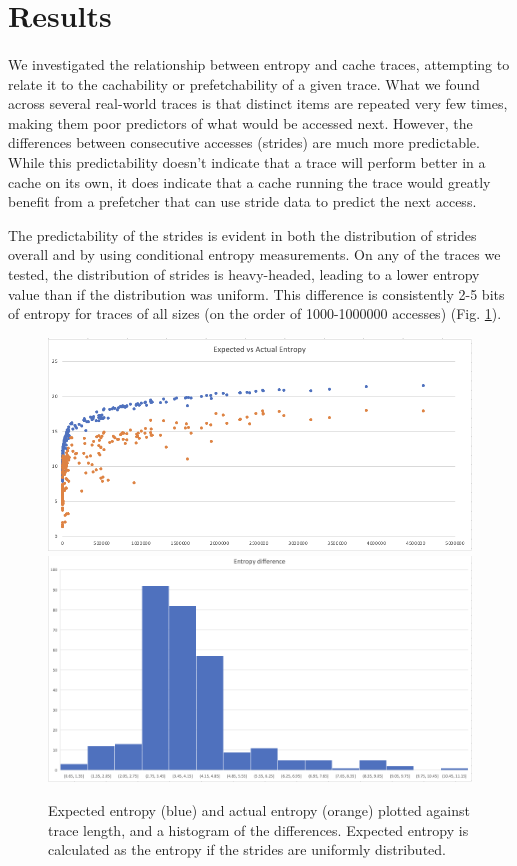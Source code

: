 \documentclass{article}
\begin{document}
\section*{Results}

\paragraph{}
We investigated the relationship between entropy and cache traces, attempting to relate it to the cachability or prefetchability of a given trace.  What we found across several real-world traces is that distinct items are repeated very few times, making them poor predictors of what would be accessed next.  However, the differences between consecutive accesses (strides) are much more predictable.  While this predictability doesn't indicate that a trace will perform better in a cache on its own, it does indicate that a cache running the trace would greatly benefit from a prefetcher that can use stride data to predict the next access.

The predictability of the strides is evident in both the distribution of strides overall and by using conditional entropy measurements.  On any of the traces we tested, the distribution of strides is heavy-headed, leading to a lower entropy value than if the distribution was uniform.  This difference is consistently 2-5 bits of entropy for traces of all sizes (on the order of 1000-1000000 accesses) (Fig. \ref{fig:expected}).

\begin{figure}[ht]
    \centering
    \includegraphics{expected entropy.png}
    \includegraphics[scale=0.8]{entropy diff.png}
    \caption{Expected entropy (blue) and actual entropy (orange) plotted against trace length, and a histogram of the differences.  Expected entropy is calculated as the entropy if the strides are uniformly distributed.}
    \label{fig:expected}
\end{figure}
\newpage
\end{document}
